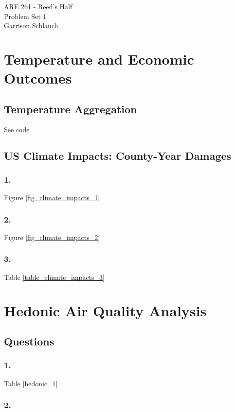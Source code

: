 \documentclass[12pt]{article}
\begin{document}
\begin{center}
ARE 261 - Reed's Half \\
Problem Set 1 \\
Garrison Schlauch
\end{center}

\section{Temperature and Economic Outcomes}

\subsection{Temperature Aggregation}
See code

\subsection{US Climate Impacts: County-Year Damages}

\subsubsection*{1.}
Figure \ref{fig_climate_impacts_1}

\subsubsection*{2.}
Figure \ref{fig_climate_impacts_2}

\subsubsection*{3.}
Table \ref{table_climate_impacts_3}

\clearpage

\section{Hedonic Air Quality Analysis}

\subsection{Questions}

\subsubsection*{1.}
Table \ref{hedonic_1}

\subsubsection*{2.}
\end{document}
